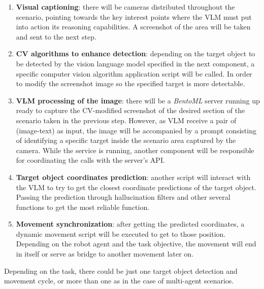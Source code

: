 \begin{enumerate}
	\item \textbf{Visual captioning}: there will be cameras distributed throughout the scenario, pointing towards the key interest points where the VLM must put into action its reasoning capabilities. A screenshot of the area will be taken and sent to the next step.
	
	\item \textbf{CV algorithms to enhance detection}: depending on the target object to be detected by the vision language model specified in the next component, a specific computer vision algorithm application script will be called. In order to modify the screenshot image so the specified target is more detectable. 
	
	\item \textbf{VLM processing of the image}: there will be a \textit{BentoML} server running up ready to capture the CV-modified screenshot of the desired section of the scenario taken in the previous step. However, as VLM receive a pair of (image-text) as input, the image will be accompanied by a prompt consisting of identifying a specific target inside the scenario area captured by the camera. While the service is running, another component will be responsible for coordinating the calls with the server's API.
	
	\item \textbf{Target object coordinates prediction}: another script will interact with the VLM to try to get the closest coordinate predictions of the target object. Passing the prediction through hallucination filters and other several functions to get the most reliable function. 
	
	\item \textbf{Movement synchronization}: after getting the predicted coordinates, a dynamic movement script will be executed to get to those position. Depending on the robot agent and the task objective, the movement will end in itself or serve as bridge to another movement later on.
\end{enumerate} 

Depending on the task, there could be just one target object detection and movement cycle, or more than one as in the case of multi-agent scenarios. 



